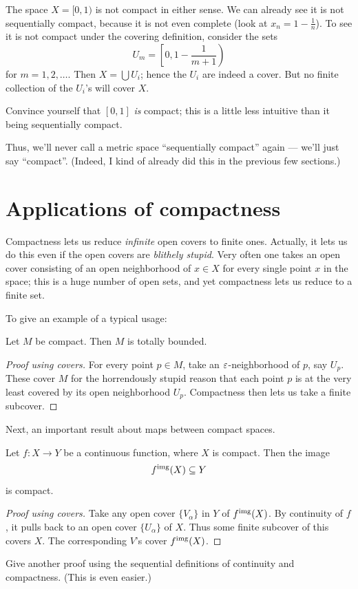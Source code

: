 \begin{example}
	The space $X = [0,1)$ is not compact in either sense. %
	We can already see it is not sequentially compact, because it is not even complete (look at $x_n = 1 - \frac 1n$).
	To see it is not compact under the covering definition, consider the sets
	\[ U_m = \left[0, 1 - \frac{1}{m+1} \right) \] %
	for $m = 1, 2, \dots$. Then $X = \bigcup U_i$; hence the $U_i$ are indeed a cover.
	But no finite collection of the $U_i$'s will cover $X$.
\end{example}
\begin{ques}
	Convince yourself that $[0,1]$ \emph{is} compact;
	this is a little less intuitive than it being sequentially compact.
\end{ques}
\begin{abuse}
	Thus, we'll never call a metric space ``sequentially compact'' again
	--- we'll just say ``compact''.
	(Indeed, I kind of already did this in the previous few sections.)
\end{abuse}


\section{Applications of compactness}
Compactness lets us reduce \emph{infinite} open covers to finite ones.
Actually, it lets us do this even if the open covers are \emph{blithely stupid}.
Very often one takes an open cover consisting
of an open neighborhood of $x \in X$ for every single point $x$ in the space;
this is a huge number of open sets,
and yet compactness lets us reduce to a finite set.

To give an example of a typical usage:
\begin{proposition}
	Let $M$ be compact. Then $M$ is totally bounded.
\end{proposition}
\begin{proof}[Proof using covers]
	For every point $p \in M$, take an $\varepsilon$-neighborhood of $p$, say $U_p$.
	These cover $M$ for the horrendously stupid reason that each point $p$ is
	at the very least covered by its open neighborhood $U_p$.
	Compactness then lets us take a finite subcover.
\end{proof}

Next, an important result about maps between compact spaces.
\begin{theorem}
	Let $f \colon X \to Y$ be a continuous function, where $X$ is compact.
	Then the image \[ f^{\text{img}}(X) \subseteq Y \] is compact.
\end{theorem}
\begin{proof}[Proof using covers]
	Take any open cover $\{V_\alpha\}$ in $Y$ of $f^{\text{img}}(X)$.
	By continuity of $f$,
	it pulls back to an open cover $\{U_\alpha\}$ of $X$.
	Thus some finite subcover of this covers $X$.
	The corresponding $V$'s cover $f^{\text{img}}(X)$.
\end{proof}
\begin{ques}
	Give another proof using the sequential definitions
	of continuity and compactness.
	(This is even easier.)
\end{ques}

